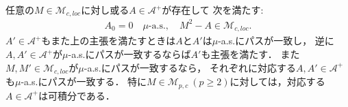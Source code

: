 	\begin{screen}
		\begin{thm}[二次変分の存在]
			任意の$M \in \mathcal{M}_{c,loc}$に対し或る$A \in \mathcal{A}^+$が存在して
			次を満たす:
			\begin{align}
				A_0 = 0\quad \mbox{$\mu$-a.s.},
				\quad M^2 - A \in \mathcal{M}_{c,loc}.
			\end{align}
			$A' \in \mathcal{A}^+$もまた上の主張を満たすときは$A$と$A'$は$\mu$-a.s.にパスが一致し，
			逆に$A,A' \in \mathcal{A}^+$が$\mu$-a.s.にパスが一致するならば$A'$も主張を満たす．
			また$M,M' \in \mathcal{M}_{c,loc}$が$\mu$-a.s.にパスが一致するなら，
			それぞれに対応する$A,A' \in \mathcal{A}^+$も$\mu$-a.s.にパスが一致する．
			特に$M \in \mathcal{M}_{p,c}\ (p \geq 2)$に対しては，対応する$A \in \mathcal{A}^+$は可積分である．
			\label{thm:existence_of_quadratic_variation}
		\end{thm}
	\end{screen}
	
